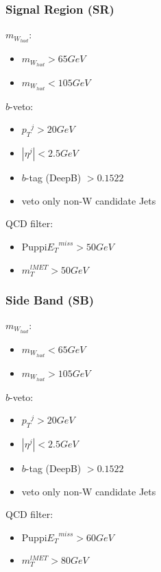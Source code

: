 \documentclass{beamer}
\begin{document}
\begin{frame}
    \frametitle{Signal Region (SR)}
    ${m_{W_{had}}}$:
    \begin{itemize}
        \item ${m_{W_{had}}} > 65 GeV$
        \item ${m_{W_{had}}} < 105 GeV$
    \end{itemize}
    $b$-veto:
    \begin{itemize}
       \item ${p_{T}}^{j} > 20 GeV$ 
       \item $|{\eta}^{j}| < 2.5 GeV$
       \item $b$-tag (DeepB) $>  0.1522$
       \item veto only non-W candidate Jets  
    \end{itemize}
    QCD filter:
    \begin{itemize}
        \item Puppi${{E}_{T}}^{miss} > 50 GeV$ 
        \item $m_{T}^{lMET} > 50 GeV$ 
    \end{itemize}
\end{frame}

\begin{frame}
    \frametitle{Side Band (SB)}
    ${m_{W_{had}}}$:
    \begin{itemize}
        \item ${m_{W_{had}}} < 65 GeV$
        \item ${m_{W_{had}}} > 105 GeV$
    \end{itemize}
    $b$-veto:
    \begin{itemize}
       \item ${p_{T}}^{j} > 20 GeV$ 
       \item $|{\eta}^{j}| < 2.5 GeV$
       \item $b$-tag (DeepB) $>  0.1522$  
       \item veto only non-W candidate Jets  
    \end{itemize}
    QCD filter:
    \begin{itemize}
        \item Puppi${{E}_{T}}^{miss} > 60 GeV$ 
        \item $m_{T}^{lMET} > 80 GeV$ 
    \end{itemize}
\end{frame}
\end{document}
